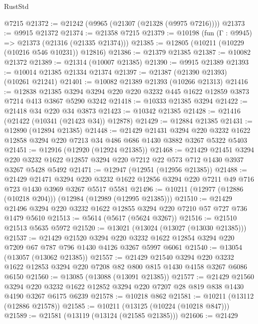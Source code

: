 \begin{lexlean}{RustStd}
\begin{coremodule}
    @7215
@21372 := @21242 (@9965 (@21307 (@21328 (@9975 @7216))))
@21373 := @9915 @21372
@21374 := @21358 @7215
@21379 := @10198 (fun (Γ : @9945) => @21373 (@21316 (@21335 @21374)))
@21385 := @12805 (@10211 (@10229 (@10216 @546 @10231)) @12816)
@21386 := @21379 @21385
@21387 := @10082 @21372
@21389 := @21314 (@10007 @21385)
@21390 := @9915 @21389
@21393 := @10014 @21385 @21334 @21374
@21397 := @21387 (@21390 @21393) (@10261 @21241)
@21401 := @10082 @21389 @21393 (@10266 @21313)
@21416 := @12838
    @21385
    @3294
    @3294
    @220
    @220
    @3232
    @445
    @1622
    @12859
    @3873
    @7214
    @413
    @3867
    @5290
    @3242
@21418 := @10333 @21385 @3294
@21422 := @21418 @34 @220 @34 @3873
@21423 := @10342 @21385
@21428 := @21416 (@21422 (@10341 (@21423 @34)) @12878)
@21429 := @12884 @21385
@21431 := @12890 (@12894 @21385)
@21448 := @21429
    @21431
    @3294
    @220
    @3232
    @1622
    @12858
    @3294
    @220
    @7213
    @34
    @486
    @686
    @1430
    @3882
    @3267
    @5322
    @5403
@21451 := @12916 (@12920 (@12924 @21385))
@21468 := @21429
    @21451
    @3294
    @220
    @3232
    @1622
    @12857
    @3294
    @220
    @7212
    @22
    @573
    @712
    @1430
    @3937
    @3267
    @5428
    @5492
@21471 := @12947 (@12951 (@12956 @21385))
@21488 := @21429
    @21471
    @3294
    @220
    @3232
    @1622
    @12856
    @3294
    @220
    @7211
    @49
    @716
    @723
    @1430
    @3969
    @3267
    @5517
    @5581
@21496 := @10211 (@12977 (@12886 (@10218 @204))) (@12984 (@12989 (@12995 @21385)))
@21510 := @21429 @21496 @3294 @220 @3232 @1622 @12855 @3294 @220 @7210 @57 @727 @736 @1479 @5610
@21513 := @5614 (@5617 (@5624 @3267))
@21516 := @21510 @21513 @5635 @5972
@21520 := @13021 (@13024 (@13027 (@13030 @21385)))
@21537 := @21429
    @21520
    @3294
    @220
    @3232
    @1622
    @12854
    @3294
    @220
    @7209
    @67
    @787
    @796
    @1430
    @4126
    @3267
    @5997
    @6061
@21540 := @13054 (@13057 (@13062 @21385))
@21557 := @21429
    @21540
    @3294
    @220
    @3232
    @1622
    @12853
    @3294
    @220
    @7208
    @82
    @800
    @815
    @1430
    @4158
    @3267
    @6086
    @6150
@21560 := @13085 (@13088 (@13091 @21385))
@21577 := @21429
    @21560
    @3294
    @220
    @3232
    @1622
    @12852
    @3294
    @220
    @7207
    @28
    @819
    @838
    @1430
    @4190
    @3267
    @6175
    @6239
@21578 := @10218 @862
@21581 := @10211 (@13112 (@12886 @21578))
@21585 := @10211 (@13125 (@10224 (@10218 @847)))
@21589 := @21581 (@13119 (@13124 (@21585 @21385)))
@21606 := @21429

\end{coremodule}
\end{lexlean}
